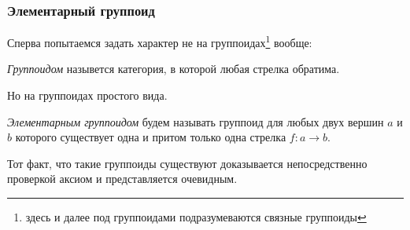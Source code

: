 \subsubsection{Элементарный группоид}
Сперва попытаемся задать характер не на группоидах\footnote{здесь и далее под 
группоидами подразумеваются связные группоиды} вообще:
\begin{definition}\cite{MacLane}
    \emph{Группоидом} назывется категория, в которой любая стрелка обратима.
\end{definition}

Но на группоидах простого вида.
\begin{definition}
    \emph{Элементарным группоидом} будем называть группоид для любых двух 
    вершин $a$ и $b$ которого существует одна и притом только одна стрелка 
    $f: a \to b$.
\end{definition}
Тот факт, что такие группоиды существуют доказывается непосредственно 
проверкой аксиом и представляется очевидным.